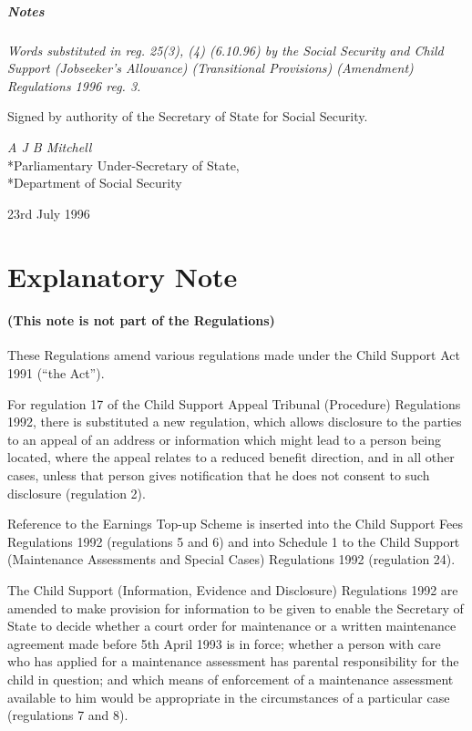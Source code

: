 \documentclass[a4paper]{article}
\newcommand{\parthead}{}
\newcommand\amendment[1]{\subsubsection*{Notes}{\itshape\frenchspacing\footnotesize #1 \par}}
\begin{document}
\amendment{
Words substituted in reg. 25(3), (4) (6.10.96) by the Social Security and Child Support (Jobseeker's Allowance) (Transitional Provisions) (Amendment) Regulations 1996 reg. 3.
}

\bigskip

Signed by authority of the Secretary of State for Social Security.

{\raggedleft
\emph{A J B Mitchell}\\*Parliamentary Under-Secretary of State,\\*Department of Social Security

}

23rd July 1996

\bigskip

\part{Explanatory Note}

\renewcommand\parthead{--- Explanatory Note}

\subsection*{(This note is not part of the Regulations)}

These Regulations amend various regulations made under the Child Support Act 1991 (“the Act”).

  For regulation 17 of the Child Support Appeal Tribunal (Procedure) Regulations 1992, there is substituted a new regulation, which allows disclosure to the parties to an appeal of an address or information which might lead to a person being located, where the appeal relates to a reduced benefit direction, and in all other cases, unless that person gives notification that he does not consent to such disclosure (regulation 2).

  Reference to the Earnings Top-up Scheme is inserted into the Child Support Fees Regulations 1992 (regulations 5 and 6) and into Schedule 1 to the Child Support (Maintenance Assessments and Special Cases) Regulations 1992 (regulation 24).

  The Child Support (Information, Evidence and Disclosure) Regulations 1992 are amended to make provision for information to be given to enable the Secretary of State to decide whether a court order for maintenance or a written maintenance agreement made before 5th April 1993 is in force; whether a person with care who has applied for a maintenance assessment has parental responsibility for the child in question; and which means of enforcement of a maintenance assessment available to him would be appropriate in the circumstances of a particular case (regulations 7 and 8).
\end{document}
